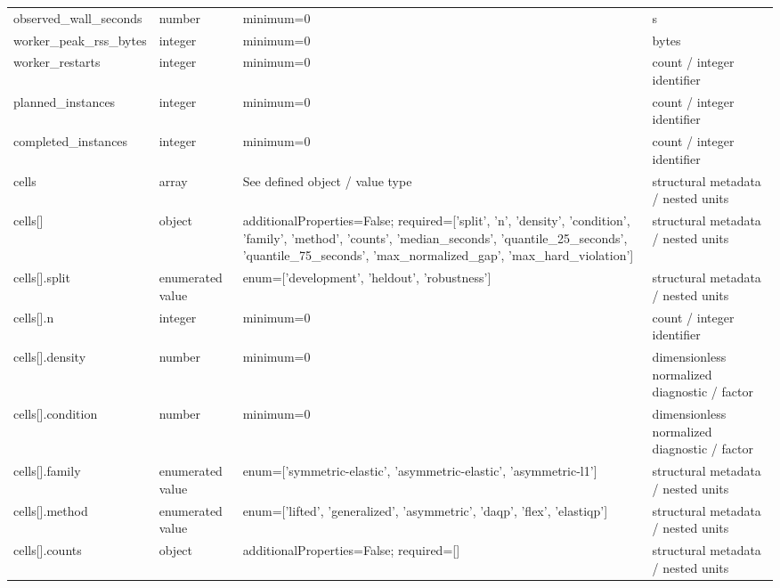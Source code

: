 \begin{longtable}{@{}>{\raggedright\arraybackslash}p{}>{\raggedright\arraybackslash}p{}>{\raggedright\arraybackslash}p{}>{\raggedright\arraybackslash}p{}@{}}
observed\_\allowbreak{}wall\_\allowbreak{}seconds & number & minimum=\allowbreak{}0 & s\\
worker\_\allowbreak{}peak\_\allowbreak{}rss\_\allowbreak{}bytes & integer & minimum=\allowbreak{}0 & bytes\\
worker\_\allowbreak{}restarts & integer & minimum=\allowbreak{}0 & count /\allowbreak{} integer identifier\\
planned\_\allowbreak{}instances & integer & minimum=\allowbreak{}0 & count /\allowbreak{} integer identifier\\
completed\_\allowbreak{}instances & integer & minimum=\allowbreak{}0 & count /\allowbreak{} integer identifier\\
cells & array & See defined object /\allowbreak{} value type & structural metadata /\allowbreak{} nested units\\
cells[] & object & additionalProperties=\allowbreak{}False; required=\allowbreak{}['split', 'n', 'density', 'condition', 'family', 'method', 'counts', 'median\_\allowbreak{}seconds', 'quantile\_\allowbreak{}25\_\allowbreak{}seconds', 'quantile\_\allowbreak{}75\_\allowbreak{}seconds', 'max\_\allowbreak{}normalized\_\allowbreak{}gap', 'max\_\allowbreak{}hard\_\allowbreak{}violation'] & structural metadata /\allowbreak{} nested units\\
cells[].\allowbreak{}split & enumerated value & enum=\allowbreak{}['development', 'heldout', 'robustness'] & structural metadata /\allowbreak{} nested units\\
cells[].\allowbreak{}n & integer & minimum=\allowbreak{}0 & count /\allowbreak{} integer identifier\\
cells[].\allowbreak{}density & number & minimum=\allowbreak{}0 & dimensionless normalized diagnostic /\allowbreak{} factor\\
cells[].\allowbreak{}condition & number & minimum=\allowbreak{}0 & dimensionless normalized diagnostic /\allowbreak{} factor\\
cells[].\allowbreak{}family & enumerated value & enum=\allowbreak{}['symmetric-\allowbreak{}elastic', 'asymmetric-\allowbreak{}elastic', 'asymmetric-\allowbreak{}l1'] & structural metadata /\allowbreak{} nested units\\
cells[].\allowbreak{}method & enumerated value & enum=\allowbreak{}['lifted', 'generalized', 'asymmetric', 'daqp', 'flex', 'elastiqp'] & structural metadata /\allowbreak{} nested units\\
cells[].\allowbreak{}counts & object & additionalProperties=\allowbreak{}False; required=\allowbreak{}[] & structural metadata /\allowbreak{} nested units\\

\end{longtable}
